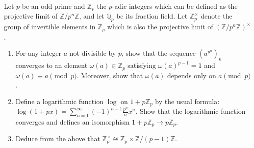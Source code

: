 \begin{exercise}
\label{algebra:2012:12}
Let $p$ be an odd prime and $\mathbb{Z}_p$ the $p$-adic integers which can be defined as the projective limit of $\mathbb{Z}/p^n\mathbb{Z}$, and let $\mathbb{Q}_p$ be its fraction field. Let $\mathbb{Z}_p^\times$ denote the group of invertible elements in $\mathbb{Z}_p$ which is also the projective limit of $(\mathbb{Z}/p^n\mathbb{Z})^\times$.
\begin{enumerate}
    \item For any integer $a$ not divisible by $p$, show that the sequence $(a^{p^n})_n$ converges to an element $\omega(a) \in \mathbb{Z}_p$ satisfying $\omega(a)^{p-1} = 1$ and $\omega(a) \equiv a \pmod{p}$. Moreover, show that $\omega(a)$ depends only on $a \pmod{p}$.
    \item Define a logarithmic function $\log$ on $1 + p\mathbb{Z}_p$ by the usual formula: $\log(1+px) = \sum_{n=1}^\infty (-1)^{n-1} \frac{p^n}{n} x^n$. Show that the logarithmic function converges and defines an isomorphism $1 + p\mathbb{Z}_p \to p\mathbb{Z}_p$.
    \item Deduce from the above that $\mathbb{Z}_p^\times \cong \mathbb{Z}_p \times \mathbb{Z}/(p-1)\mathbb{Z}$.
\end{enumerate}
\end{exercise}

